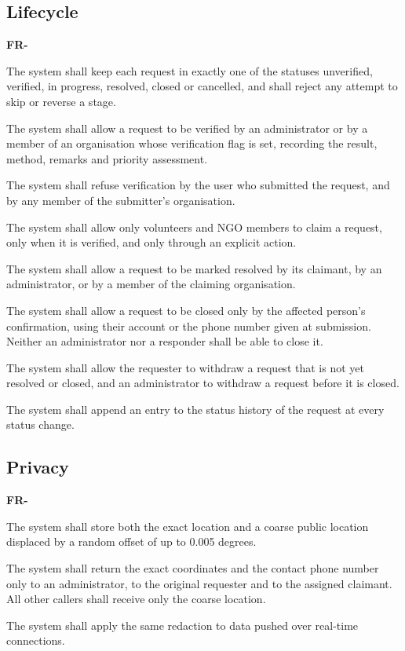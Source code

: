 \documentclass{scrreprt}
\newcounter{fr}
\newcounter{frsave}
\newenvironment{frlist}
  {\begin{list}{\textbf{FR-\arabic{fr}}}{\usecounter{fr}\setcounter{fr}{\value{frsave}}%
   \setlength{\labelwidth}{1.5cm}\setlength{\leftmargin}{1.8cm}%
   \setlength{\itemsep}{3pt}\setlength{\parsep}{2pt}}}
  {\setcounter{frsave}{\value{fr}}\end{list}}
\begin{document}
\subsection*{Lifecycle}
\begin{frlist}
    \item The system shall keep each request in exactly one of the statuses unverified, verified, in progress, resolved, closed or cancelled, and shall reject any attempt to skip or reverse a stage.
    \item The system shall allow a request to be verified by an administrator or by a member of an organisation whose verification flag is set, recording the result, method, remarks and priority assessment.
    \item The system shall refuse verification by the user who submitted the request, and by any member of the submitter's organisation.
    \item The system shall allow only volunteers and NGO members to claim a request, only when it is verified, and only through an explicit action.
    \item The system shall allow a request to be marked resolved by its claimant, by an administrator, or by a member of the claiming organisation.
    \item The system shall allow a request to be closed only by the affected person's confirmation, using their account or the phone number given at submission. Neither an administrator nor a responder shall be able to close it.
    \item The system shall allow the requester to withdraw a request that is not yet resolved or closed, and an administrator to withdraw a request before it is closed.
    \item The system shall append an entry to the status history of the request at every status change.
\end{frlist}

\subsection*{Privacy}
\begin{frlist}
    \item The system shall store both the exact location and a coarse public location displaced by a random offset of up to 0.005 degrees.
    \item The system shall return the exact coordinates and the contact phone number only to an administrator, to the original requester and to the assigned claimant. All other callers shall receive only the coarse location.
    \item The system shall apply the same redaction to data pushed over real-time connections.
\end{frlist}
\end{document}

